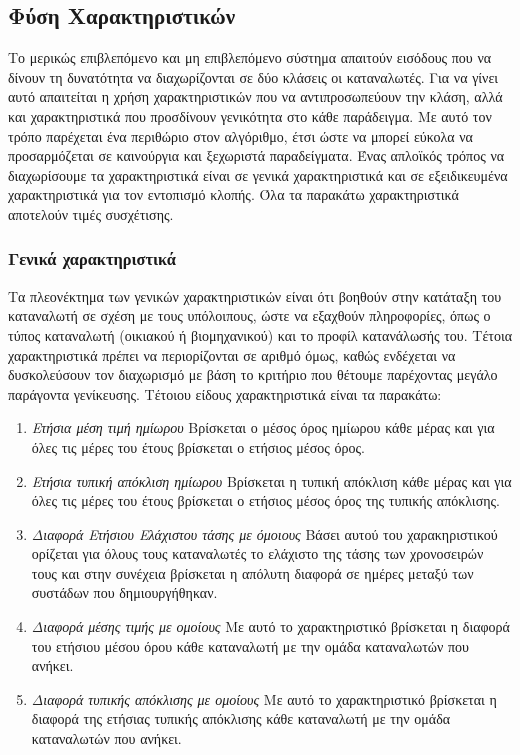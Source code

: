 \subsection{Φύση Χαρακτηριστικών}
Το μερικώς επιβλεπόμενο και μη επιβλεπόμενο σύστημα απαιτούν εισόδους που να δίνουν τη δυνατότητα να διαχωρίζονται σε δύο κλάσεις οι καταναλωτές. Για να γίνει αυτό απαιτείται η χρήση χαρακτηριστικών που να αντιπροσωπεύουν την κλάση, αλλά και χαρακτηριστικά που προσδίνουν γενικότητα στο κάθε παράδειγμα. Με αυτό τον τρόπο παρέχεται ένα περιθώριο στον αλγόριθμο, έτσι ώστε να μπορεί εύκολα να προσαρμόζεται σε καινούργια και ξεχωριστά παραδείγματα. Ένας απλοϊκός τρόπος να διαχωρίσουμε τα χαρακτηριστικά είναι σε γενικά χαρακτηριστικά  και σε εξειδικευμένα χαρακτηριστικά για τον εντοπισμό κλοπής. Όλα τα παρακάτω χαρακτηριστικά αποτελούν τιμές συσχέτισης.
\subsubsection{Γενικά χαρακτηριστικά} 
Τα πλεονέκτημα των γενικών χαρακτηριστικών είναι ότι βοηθούν στην κατάταξη του καταναλωτή σε σχέση με τους υπόλοιπους, ώστε να εξαχθούν πληροφορίες, όπως ο τύπος καταναλωτή (οικιακού ή βιομηχανικού) και το προφίλ κατανάλωσής του. Τέτοια χαρακτηριστικά πρέπει να περιορίζονται σε αριθμό όμως, καθώς ενδέχεται να δυσκολεύσουν τον διαχωρισμό με βάση το κριτήριο που θέτουμε παρέχοντας μεγάλο παράγοντα γενίκευσης.  Τέτοιου είδους χαρακτηριστικά είναι τα παρακάτω:
\begin{enumerate}
\item{\textit{Ετήσια μέση τιμή ημίωρου}} Βρίσκεται ο μέσος όρος ημίωρου κάθε μέρας και για όλες τις μέρες του έτους βρίσκεται ο ετήσιος μέσος όρος.
\item{\textit{Ετήσια τυπική απόκλιση ημίωρου}} Βρίσκεται η τυπική απόκλιση κάθε μέρας και για όλες τις μέρες του έτους βρίσκεται ο ετήσιος μέσος όρος της τυπικής απόκλισης.
\item{\textit{Διαφορά Ετήσιου Ελάχιστου τάσης με όμοιους}} Βάσει αυτού του χαρακηριστικού ορίζεται για όλους τους καταναλωτές το ελάχιστο της τάσης των χρονοσειρών τους και στην συνέχεια βρίσκεται η απόλυτη διαφορά σε ημέρες μεταξύ των συστάδων που δημιουργήθηκαν.
\item{\textit{Διαφορά μέσης τιμής με ομοίους}} Με αυτό το χαρακτηριστικό βρίσκεται η διαφορά του ετήσιου μέσου όρου κάθε καταναλωτή με την ομάδα καταναλωτών που ανήκει.
\item{\textit{Διαφορά τυπικής απόκλισης με ομοίους}} Με αυτό το χαρακτηριστικό βρίσκεται η διαφορά της ετήσιας τυπικής απόκλισης κάθε καταναλωτή με την ομάδα καταναλωτών που ανήκει.
\end{enumerate}
